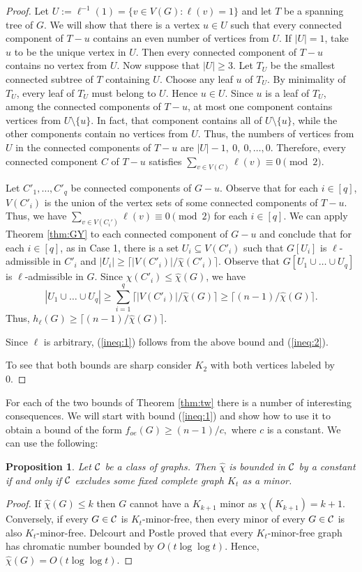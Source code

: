 \documentclass{article}
\newcommand{\mchi}{\hat{\chi}}
\newcommand{\2}{\vspace{0.2cm}}
\newtheorem{proposition}[theorem]{Proposition}
\begin{document}
\begin{proof}
 Let $U:=\ell^{-1}(1)=\{v\in V(G): \ell(v)=1\}$ and let $T$ be a spanning tree of $G$. We will show that there is a vertex $u\in U$ such that every connected component of $T-u$ contains an even number of vertices from $U$.
If $|U|=1$, take $u$ to be the unique vertex in $U$. Then every connected component of $T-u$ contains no vertex from $U$. Now suppose that $|U|\ge 3$. Let $T_U$ be the smallest connected subtree of $T$ containing $U$. Choose any leaf $u$ of $T_U.$
By minimality of $T_U$, every leaf of $T_U$ must belong to $U$. Hence $u\in U$.
Since $u$ is a leaf of $T_U$, among the connected components of $T-u$, at most one component contains vertices from $U\setminus\{u\}$. In fact, that component contains all of $U\setminus\{u\}$, while the other components contain no vertices from $U$. Thus, the numbers of vertices from $U$ in the connected components of $T-u$ are
\(
|U|-1,\ 0,\ 0,\ldots,0.
\)
Therefore, every connected component $C$ of $T-u$ satisfies
\(
\sum_{v\in V(C)} \ell(v)\equiv 0\pmod 2.
\)

Let $C'_1,\dots ,C'_q$ be connected components of $G-u$. 
Observe that for each $i\in [q]$, $V(C'_i)$ is the union of the vertex sets of some connected components of $T-u$.
Thus, we have \(
\sum_{v\in V(C_i')} \ell(v)\equiv 0\pmod 2
\) for each $i\in [q]$. 
We can apply Theorem \ref{thm:GY} to each connected component of $G-u$ and conclude that for each $i\in [q]$, as in Case 1,
there is a set $U_i\subseteq V(C'_i)$ such that $G[U_i]$ is $\ell$-admissible in $C'_i$ and $|U_i|\ge \lceil |V(C'_i)|/\mchi(C'_i) \rceil.$
Observe that $G[U_1\cup \dots \cup U_q]$ is $\ell$-admissible in $G$.
Since $\mchi(C'_i)\le \mchi(G)$, we have $$|U_1\cup \dots \cup U_q|\ge \sum_{i=1}^q \lceil |V(C'_i)|/\mchi(G) \rceil\ge \lceil (n-1)/\mchi(G)\rceil.$$ Thus, $h_{\ell}(G)\ge \lceil (n-1)/\mchi(G)\rceil .$

Since $\ell$ is arbitrary, (\ref{ineq:1}) follows from the above bound and (\ref{ineq:2}). 

To see that both bounds are sharp consider $K_2$ with both vertices labeled by 0. 
\end{proof}

For each of the two bounds of Theorem \ref{thm:tw} there is a number of interesting consequences. We will start with bound (\ref{ineq:1}) and show how to use 
it to obtain a bound of the form $f_{oe}(G)\ge (n-1)/c,$ where $c$ is a constant. We can use the following:

\begin{proposition}\label{prop:finite}
Let $\cal C$ be a class of graphs. Then $\mchi$ is bounded in $\cal C$ by a constant if and only if $\cal C$ excludes some fixed complete graph $K_t$ as a minor.    
\end{proposition}
\begin{proof}
If $\mchi(G)\le k$ then $G$ cannot have a $K_{k+1}$ minor as $\chi(K_{k+1})=k+1.$ Conversely, if every $G\in \cal C$ is $K_t$-minor-free, 
then every minor of every $G\in \cal C$ is also $K_t$-minor-free. Delcourt and Postle \cite{DP} proved that every $K_t$-minor-free graph has chromatic number bounded by 
$O(t\log\log t).$ Hence, $\mchi(G)=O(t\log\log t).$
\end{proof}
\end{document}
